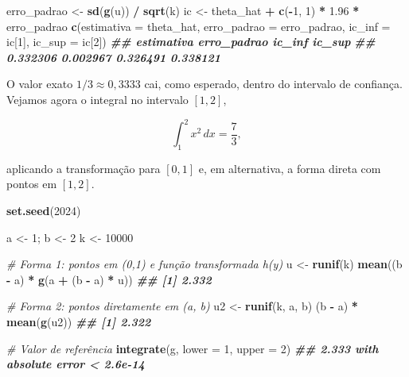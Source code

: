 \documentclass[
  portuguese,
  11pt,
  openany]{book}
\newenvironment{Shaded}{\begin{snugshade}}{\end{snugshade}}
\newcommand{\AttributeTok}[1]{\textcolor[rgb]{0.13,0.29,0.53}{#1}}
\newcommand{\CommentTok}[1]{\textcolor[rgb]{0.56,0.35,0.01}{\textit{#1}}}
\newcommand{\DecValTok}[1]{\textcolor[rgb]{0.00,0.00,0.81}{#1}}
\newcommand{\DocumentationTok}[1]{\textcolor[rgb]{0.56,0.35,0.01}{\textbf{\textit{#1}}}}
\newcommand{\FloatTok}[1]{\textcolor[rgb]{0.00,0.00,0.81}{#1}}
\newcommand{\FunctionTok}[1]{\textcolor[rgb]{0.13,0.29,0.53}{\textbf{#1}}}
\newcommand{\NormalTok}[1]{#1}
\newcommand{\OtherTok}[1]{\textcolor[rgb]{0.56,0.35,0.01}{#1}}
\newcommand{\SpecialCharTok}[1]{\textcolor[rgb]{0.81,0.36,0.00}{\textbf{#1}}}
\begin{document}
\begin{Shaded}
\begin{Highlighting}[]
\NormalTok{erro\_padrao }\OtherTok{\textless{}{-}} \FunctionTok{sd}\NormalTok{(}\FunctionTok{g}\NormalTok{(u)) }\SpecialCharTok{/} \FunctionTok{sqrt}\NormalTok{(k)}
\NormalTok{ic }\OtherTok{\textless{}{-}}\NormalTok{ theta\_hat }\SpecialCharTok{+} \FunctionTok{c}\NormalTok{(}\SpecialCharTok{{-}}\DecValTok{1}\NormalTok{, }\DecValTok{1}\NormalTok{) }\SpecialCharTok{*} \FloatTok{1.96} \SpecialCharTok{*}\NormalTok{ erro\_padrao}
\FunctionTok{c}\NormalTok{(}\AttributeTok{estimativa =}\NormalTok{ theta\_hat, }\AttributeTok{erro\_padrao =}\NormalTok{ erro\_padrao,}
  \AttributeTok{ic\_inf =}\NormalTok{ ic[}\DecValTok{1}\NormalTok{], }\AttributeTok{ic\_sup =}\NormalTok{ ic[}\DecValTok{2}\NormalTok{])}
\DocumentationTok{\#\#  estimativa erro\_padrao      ic\_inf      ic\_sup }
\DocumentationTok{\#\#    0.332306    0.002967    0.326491    0.338121}
\end{Highlighting}
\end{Shaded}

O valor exato \(1/3 \approx 0{,}3333\) cai, como esperado, dentro do intervalo de
confiança. Vejamos agora o integral no intervalo \([1, 2]\),

\[
\int_{1}^{2} x^2\, dx = \frac{7}{3},
\]

aplicando a transformação para \([0,1]\) e, em alternativa, a forma direta com
pontos em \([1, 2]\).

\begin{Shaded}
\begin{Highlighting}[]
\FunctionTok{set.seed}\NormalTok{(}\DecValTok{2024}\NormalTok{)}

\NormalTok{a }\OtherTok{\textless{}{-}} \DecValTok{1}\NormalTok{; b }\OtherTok{\textless{}{-}} \DecValTok{2}
\NormalTok{k }\OtherTok{\textless{}{-}} \DecValTok{10000}

\CommentTok{\# Forma 1: pontos em (0,1) e função transformada h(y)}
\NormalTok{u }\OtherTok{\textless{}{-}} \FunctionTok{runif}\NormalTok{(k)}
\FunctionTok{mean}\NormalTok{((b }\SpecialCharTok{{-}}\NormalTok{ a) }\SpecialCharTok{*} \FunctionTok{g}\NormalTok{(a }\SpecialCharTok{+}\NormalTok{ (b }\SpecialCharTok{{-}}\NormalTok{ a) }\SpecialCharTok{*}\NormalTok{ u))}
\DocumentationTok{\#\# [1] 2.332}

\CommentTok{\# Forma 2: pontos diretamente em (a, b)}
\NormalTok{u2 }\OtherTok{\textless{}{-}} \FunctionTok{runif}\NormalTok{(k, a, b)}
\NormalTok{(b }\SpecialCharTok{{-}}\NormalTok{ a) }\SpecialCharTok{*} \FunctionTok{mean}\NormalTok{(}\FunctionTok{g}\NormalTok{(u2))}
\DocumentationTok{\#\# [1] 2.322}

\CommentTok{\# Valor de referência}
\FunctionTok{integrate}\NormalTok{(g, }\AttributeTok{lower =} \DecValTok{1}\NormalTok{, }\AttributeTok{upper =} \DecValTok{2}\NormalTok{)}
\DocumentationTok{\#\# 2.333 with absolute error \textless{} 2.6e{-}14}
\end{Highlighting}
\end{Shaded}
\end{document}
